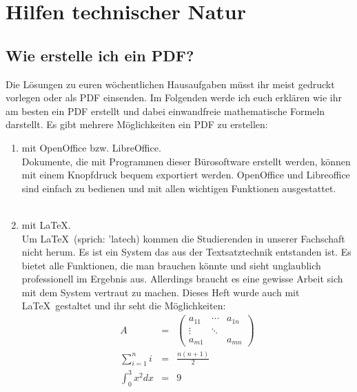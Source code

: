 
\section{Hilfen technischer Natur}

\subsection{Wie erstelle ich ein PDF?}

Die Lösungen zu euren wöchentlichen Hausaufgaben müsst ihr meist gedruckt vorlegen oder als PDF einsenden.
Im Folgenden werde ich euch erklären wie ihr am besten ein PDF erstellt und dabei einwandfreie mathematische Formeln darstellt.
Es gibt mehrere Möglichkeiten ein PDF zu erstellen:

\begin{enumerate}
    \item mit OpenOffice bzw. LibreOffice.\\
          Dokumente, die mit Programmen dieser Bürosoftware erstellt werden, können mit einem Knopfdruck bequem exportiert werden.
          OpenOffice und Libreoffice sind einfach zu bedienen und mit allen wichtigen Funktionen ausgestattet.\\
          \\
    \item mit \LaTeX.\\
          Um \LaTeX~(sprich: 'latech) kommen die Studierenden in unserer Fachschaft nicht herum. 
          Es ist ein System das aus der Textsatztechnik entstanden ist.
          Es bietet alle Funktionen, die man brauchen könnte und sieht unglaublich professionell im Ergebnis aus.
          Allerdings braucht es eine gewisse Arbeit sich mit dem System vertraut zu machen.
          Dieses Heft wurde auch mit \LaTeX~gestaltet und ihr seht die Möglichkeiten:
          \begin{eqnarray*}
               A & = & \left(\begin{array}{ccc} a_{11} & \cdots & a_{1n}\\
                                                    \vdots & \ddots & \\
                                                   a_{m1} &        & a_{mn} \end{array}\right)\\
               \sum_{i=1}^n i & = & \frac{n(n+1)}{2}\\
               \int_{0}^{3}x^2dx & = & 9\\

\end{eqnarray*}
\end{enumerate}

